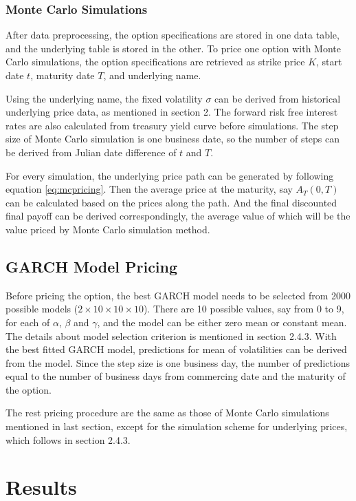 \documentclass[10pt, a4paper, twocolumn]{article} %
\begin{document}
\subsubsection{Monte Carlo Simulations}

After data preprocessing, the option specifications are stored in one data table, and the underlying table is stored in the other. To price one option with Monte Carlo simulations, the option specifications are retrieved as strike price $K$, start date $t$, maturity date $T$, and underlying name.

Using the underlying name, the fixed volatility $\sigma$ can be derived from historical underlying price data, as mentioned in section 2. The forward risk free interest rates are also calculated from treasury yield curve before simulations. The step size of Monte Carlo simulation is one business date, so the number of steps can be derived from Julian date difference of $t$ and $T$.

For every simulation, the underlying price path can be generated by following equation \ref{eq:mcpricing}. Then the average price at the maturity, say $A_T(0,T)$ can be calculated based on the prices along the path. And the final discounted final payoff can be derived correspondingly, the average value of which will be the value priced by Monte Carlo simulation method.

\subsection{GARCH Model Pricing}

Before pricing the option, the best GARCH model needs to be selected from 2000 possible models ($2\times10\times10\times10$). There are 10 possible values, say from 0 to 9, for each of $\alpha$, $\beta$ and $\gamma$, and the model can be either zero mean or constant mean. The details about model selection criterion is mentioned in section 2.4.3. With the best fitted GARCH model, predictions for mean of volatilities can be derived from the model. Since the step size is one business day, the number of predictions equal to the number of business days from commercing date  and the maturity of the option.

The rest pricing procedure are the same as those of Monte Carlo simulations mentioned in last section, except for the simulation scheme for underlying prices, which follows in section 2.4.3.

\section{Results}
\end{document}
